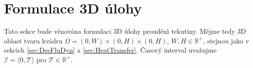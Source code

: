 




    \section{Formulace 3D \'{u}lohy}
    \label{sec:DefCas3D}
        
        
        Tato sekce bude v\v{e}nov\'{a}na formulaci 3D \'{u}lohy proud\v{e}n\'{\i} tekutiny. M\v{e}jme tedy 3D oblast tvaru kv\'{a}dru $\Omega = (0,W) \times (0,H) \times (0,H)$, $W,H \in \mathbb{R}^+$, stejnou jako v sekc\'{\i}ch \ref{sec:DesFluDyn} a \ref{sec:HeatTransfer}. \v{C}asov\'{y} interval uva\v{z}ujme $\mathcal{I} = \langle 0,\mathcal{T} \rangle$ pro $\mathcal{T} \in \mathbb{R}^{+}$.
        
